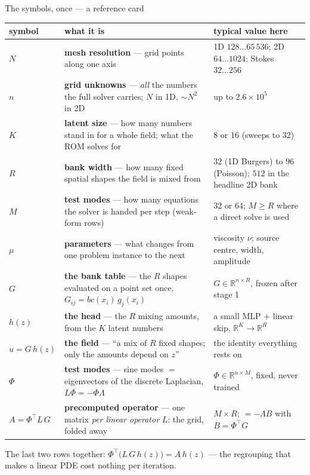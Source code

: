 \documentclass[10pt,aspectratio=169]{beamer}
\newcommand{\T}{^{\top}}
\newcommand{\R}{\mathbb{R}}
\begin{document}
\begin{frame}{The symbols, once --- a reference card}
  \centering\scriptsize
  \renewcommand{\arraystretch}{1.0}
  \begin{tabular}{@{}lp{}p{}@{}}
    \toprule
    symbol & what it is & typical value here\\
    \midrule
    $N$ & \textbf{mesh resolution} --- grid points along one axis & 1D $128\ldots65\,536$; 2D $64\ldots1024$; Stokes $32\ldots256$\\
    $n$ & \textbf{grid unknowns} --- \emph{all} the numbers the full solver carries; $N$ in 1D, $\sim N^{2}$ in 2D & up to $2.6\times10^{5}$\\
    $K$ & \textbf{latent size} --- how many numbers stand in for a whole field; what the ROM solves for & $8$ or $16$ (sweeps to $32$)\\
    $R$ & \textbf{bank width} --- how many fixed spatial shapes the field is mixed from & $32$ (1D Burgers) to $96$ (Poisson); $512$ in the headline 2D bank\\
    $M$ & \textbf{test modes} --- how many equations the solver is handed per step (weak-form rows) & $32$ or $64$; $M\ge R$ where a direct solve is used\\
    $\mu$ & \textbf{parameters} --- what changes from one problem instance to the next & viscosity $\nu$; source centre, width, amplitude\\
    \midrule
    $G$ & \textbf{the bank table} --- the $R$ shapes evaluated on a point set once, $G_{ij}=bc(x_i)\,g_j(x_i)$ & $G\in\R^{n\times R}$, frozen after stage 1\\
    $h(z)$ & \textbf{the head} --- the $R$ mixing amounts, from the $K$ latent numbers & a small MLP $+$ linear skip, $\R^{K}\to\R^{R}$\\
    $u = G\,h(z)$ & \textbf{the field} --- ``a mix of $R$ fixed shapes; only the amounts depend on $z$'' & the identity everything rests on\\
    $\Phi$ & \textbf{test modes} --- sine modes $=$ eigenvectors of the discrete Laplacian, $L\Phi=-\Phi\Lambda$ & $\Phi\in\R^{n\times M}$, fixed, never trained\\
    $A = \Phi\T L\,G$ & \textbf{precomputed operator} --- one matrix \emph{per linear operator} $L$: the grid, folded away & $M\times R$; $=-\Lambda B$ with $B=\Phi\T G$\\
    \bottomrule
  \end{tabular}

  \vspace{0.5mm}
  {\footnotesize The last two rows together: $\Phi\T\big(L\,G\,h(z)\big) = A\,h(z)$ --- the regrouping that makes a linear PDE cost nothing per iteration.}
\end{frame}
\end{document}

